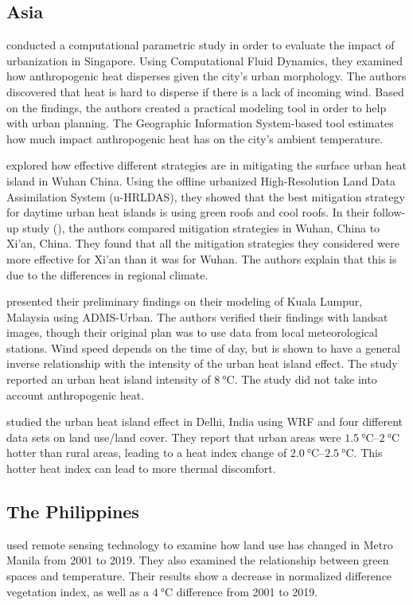 				
	\subsection{Asia}
		\textcite{Yuan2020} conducted a computational parametric study in order to evaluate the impact of urbanization in Singapore.
		Using Computational Fluid Dynamics, they examined how anthropogenic heat disperses given the city's urban morphology.
		The authors discovered that heat is hard to disperse if there is a lack of incoming wind.
		Based on the findings, the authors created a practical modeling tool in order to help with urban planning. 
		The Geographic Information System-based tool estimates how much impact anthropogenic heat has on the city's ambient temperature.
		
		\textcite{Gao2019} explored how effective different strategies are in mitigating the surface urban heat island in Wuhan China.
		Using the offline urbanized High-Resolution Land Data Assimilation System (u-HRLDAS), they showed that the best mitigation strategy for daytime urban heat islands is using green roofs and cool roofs.
		In their follow-up study (\cite{Gao2020}), the authors compared mitigation strategies in Wuhan, China to Xi'an, China.
		They found that all the mitigation strategies they considered were more effective for Xi'an than it was for Wuhan. 
		The authors explain that this is due to the differences in regional climate.
		
		\textcite{Wang2019} presented their preliminary findings on their modeling of Kuala Lumpur, Malaysia using ADMS-Urban.
		The authors verified their findings with landsat images, though their original plan was to use data from local meteorological stations.
		Wind speed depends on the time of day, but is shown to have a general inverse relationship with the intensity of the urban heat island effect.
		The study reported an urban heat island intensity of $\qty{8}{\degreeCelsius}$.
		The study did not take into account anthropogenic heat.
		
		\textcite{Bhati2018} studied the urban heat island effect in Delhi, India using WRF and four different data sets on land use/land cover.
		They report that urban areas were $\qtyrange{1.5}{2}{\degreeCelsius}$ hotter than rural areas, leading to a heat index change of $\qtyrange{2.0}{2.5}{\degreeCelsius}$.
		This hotter heat index can lead to more thermal discomfort.

	\subsection{The Philippines}
		\textcite{AlmadronesReyes2022} used remote sensing technology to examine how land use has changed in Metro Manila from 2001 to 2019. 
		They also examined the relationship between green spaces and temperature. 
		Their results show a decrease in normalized difference vegetation index, 
			as well as a $\qty{4}{\degreeCelsius}$ difference from 2001 to 2019.
		
